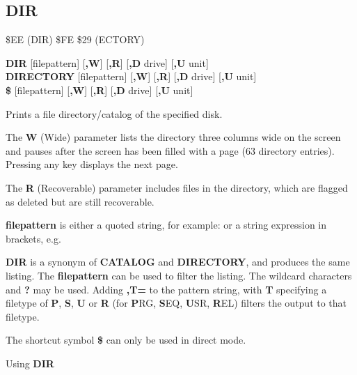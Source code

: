 
\newpage
\subsection{DIR}
\begin{description}[leftmargin=2cm,style=nextline]
\item [Token:] \$EE (DIR) \$FE \$29 (ECTORY)
\item [Format:] {\bf DIR} [filepattern] [{\bf,W}] [{\bf,R}] [{\bf,D} drive] [{\bf,U} unit] \\
		{\bf DIRECTORY} [filepattern] [{\bf,W}] [{\bf,R}] [{\bf,D} drive] [{\bf,U} unit] \\
		{\bf \$} [filepattern] [{\bf,W}] [{\bf,R}] [{\bf,D} drive] [{\bf,U} unit]
\item [Usage:]  Prints a file directory/catalog of the specified disk.

   The {\bf W} (Wide) parameter lists the directory three columns wide
   on the screen and pauses after the screen has been filled with a page
   (63 directory entries). Pressing any key displays the next page.

   The {\bf R} (Recoverable) parameter includes files in the
   directory, which are flagged as deleted but are still
   recoverable.

   {\bf filepattern} is either a quoted string, for example:  or
   a string expression in brackets, e.g. 

   \drivedefinition

   \unitdefinition

\item [Remarks:]
   {\bf DIR} is a synonym of {\bf CATALOG}
   and {\bf DIRECTORY}, and produces the same listing.
   The {\bf filepattern} can be used to filter the listing.
   The wildcard characters {\bf *} and {\bf ?} may be used.
   Adding {\bf ,T=} to the pattern string, with {\bf T} specifying
   a filetype of {\bf P}, {\bf S}, {\bf U} or {\bf R}
   (for {\bf P}RG, {\bf S}EQ, {\bf U}SR, {\bf R}EL) filters the
   output to that filetype.

   The shortcut symbol {\bf \$} can only be used in direct mode.

\item [Examples:] Using {\bf DIR}


%
%
%
%
%


\end{description}

